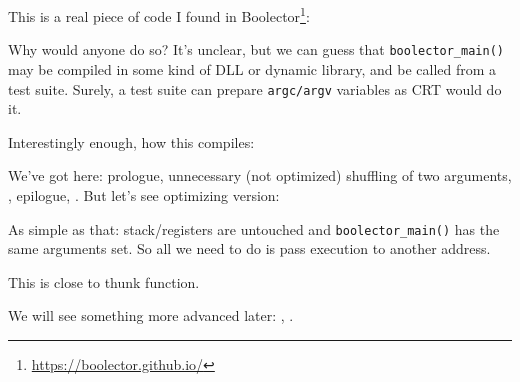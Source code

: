 \label{Boolector}

This is a real piece of code I found in Boolector\footnote{\url{https://boolector.github.io/}}:



Why would anyone do so?
It's unclear, but we can guess that \verb|boolector_main()| may be compiled in some kind of DLL or dynamic library,
and be called from a test suite.
Surely, a test suite can prepare \verb|argc/argv| variables as \ac{CRT} would do it.

Interestingly enough, how this compiles:



We've got here: prologue, unnecessary (not optimized) shuffling of two arguments, , epilogue, .
But let's see optimizing version:



As simple as that: stack/registers are untouched and \verb|boolector_main()| has the same arguments set.
So all we need to do is pass execution to another address.

This is close to \gls{thunk function}.

We will see something more advanced later: , .

